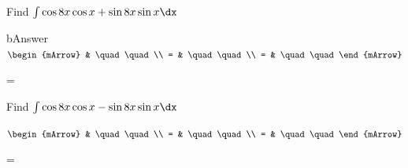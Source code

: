 \begin{mtask}
   \task \begin{exercise} Find $\int \cos{8x}\cos{x} + \sin{8x}\sin{x} \dx$
           \begin{envSolution}[height=5cm]{bAnswer}
             $\begin{mArrow}
                   & \quad \quad              \\
		   		 = & \quad \quad              \\
				 = & \quad \quad 
              \end{mArrow}$
            \begin{shortsolution}  
			     =$ \quad \quad \quad \quad$
			\end{shortsolution}				 
           \end{envSolution}
         \end{exercise}

   \task \begin{exercise} Find $\int \cos{8x}\cos{x} - \sin{8x}\sin{x} \dx$
           \begin{envSolution}[height=5cm]
             $\begin{mArrow}
                   & \quad \quad              \\
		   		 = & \quad \quad              \\
				 = & \quad \quad 
              \end{mArrow}$
            \begin{shortsolution}  
			     =$ \quad \quad \quad \quad$
			\end{shortsolution}				 
           \end{envSolution}
         \end{exercise}

\end{mtask}


